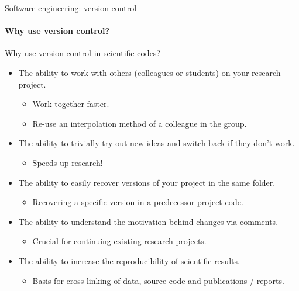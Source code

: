 \documentclass[
	aspectratio=169,%
	color={accentcolor=2d},
	logo=true,%
	colorframetitle=true,%
	]{tudabeamer}
\begin{document}
\begin{frame}{Software engineering: version control}
    \framesubtitle{Why use version control?}

    \vfill
    Why use version control in scientific codes?  
    \begin{itemize}
        \item The ability to work with others (colleagues or students) on your research project. 
            \begin{itemize}
                \item Work together faster.
                \item Re-use an interpolation method of a colleague in the group.
            \end{itemize}
        \item The ability to trivially try out new ideas and switch back if they don't work.
            \begin{itemize}
                \item Speeds up research!
            \end{itemize}
        \item The ability to easily recover versions of your project in the same folder. 
            \begin{itemize}
                \item Recovering a specific version in a predecessor project code.
            \end{itemize}
        \item The ability to understand the motivation behind changes via comments. 
            \begin{itemize}
                \item Crucial for continuing existing research projects.
            \end{itemize}
        \item The ability to increase the reproducibility of scientific results. 
            \begin{itemize}
                \item Basis for cross-linking of data, source code and publications / reports.  
            \end{itemize}
    \end{itemize}

\end{frame}
\end{document}
